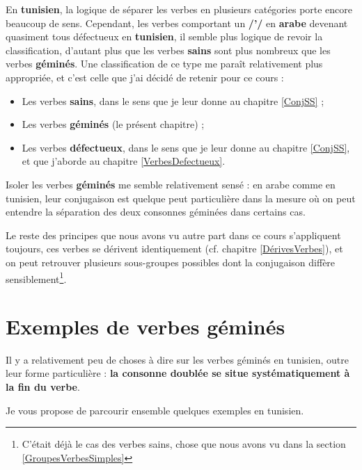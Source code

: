 En \textbf{tunisien}, la logique de séparer les verbes en plusieurs catégories porte encore beaucoup de sens. Cependant, les verbes comportant un \textbf{/'/} en \textbf{arabe} devenant quasiment tous défectueux en \textbf{tunisien}, il semble plus logique de revoir la classification, d'autant plus que les verbes \textbf{sains} sont plus nombreux que les verbes \textbf{géminés}. Une classification de ce type me paraît relativement plus appropriée, et c'est celle que j'ai décidé de retenir pour ce cours : 
\begin{itemize}
    \item Les verbes \textbf{sains}, dans le sens que je leur donne au chapitre \ref{ConjSS} ;
    \item Les verbes \textbf{géminés} (le présent chapitre) ;
    \item Les verbes \textbf{défectueux}, dans le sens que je leur donne au chapitre \ref{ConjSS}, et que j'aborde au chapitre \ref{VerbesDefectueux}.
\end{itemize}

Isoler les verbes \textbf{géminés} me semble relativement sensé : en arabe comme en tunisien, leur conjugaison est quelque peut particulière dans la mesure où on peut entendre la séparation des deux consonnes géminées dans certains cas. 

Le reste des principes que nous avons vu autre part dans ce cours s'appliquent toujours, ces verbes se dérivent identiquement (cf. chapitre \ref{DérivesVerbes}), et on peut retrouver plusieurs sous-groupes possibles dont la conjugaison diffère sensiblement\footnote{C'était déjà le cas des verbes sains, chose que nous avons vu dans la section \ref{GroupesVerbesSimples}}. 

\section{Exemples de verbes géminés}
Il y a relativement peu de choses à dire sur les verbes géminés en tunisien, outre leur forme particulière : \textbf{la consonne doublée se situe systématiquement à la fin du verbe}. 

Je vous propose de parcourir ensemble quelques exemples en tunisien.

